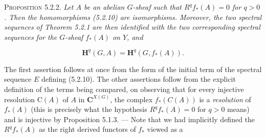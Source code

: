 \textsc{Proposition 5.2.2.} \textit{Let $A$ be an abelian
$G$-sheaf such that $R^qf_*(A)=0$ for $q>0$. Then the homomorphisms \textup{(5.2.10)}
are isomorphisms. Moreover, the two spectral sequences of Theorem \textup{5.2.1} are
then identified with the two corresponding spectral sequences for the
$G$-sheaf $f_*(A)$ on $Y$, and}

\[
\mathbf H^q(G,A)=\mathbf H^q(G,f_*(A)).
\tag{5.2.11}
\]

The first assertion follows at once from the form of the initial term of the
spectral sequence $E$ defining (5.2.10). The other assertions follow from the
explicit definition of the terms being compared, on observing that for every
injective resolution $\mathrm C(A)$ of $A$ in ${\mathbf C}^{X(G)}$, the complex $f_*(C(A))$ is
a \textit{resolution} of $f_*(A)$ (this is precisely what the hypothesis
$R^qf_*(A)=0$ for $q>0$ means) and is injective by Proposition 5.1.3. --- Note
that we had implicitly defined the $R^qf_*(A)$ as the right derived functors
of $f_*$ viewed as a

